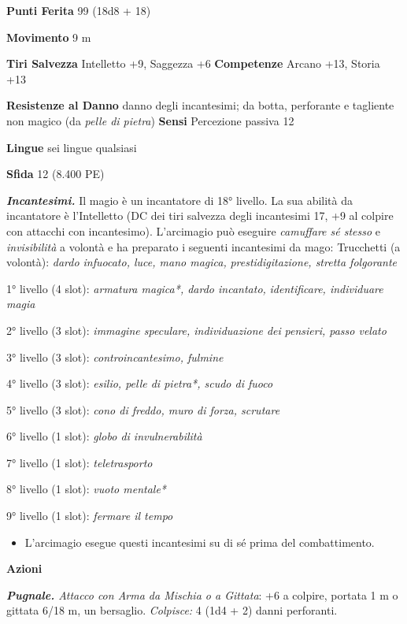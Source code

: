 \begin{multicols}{2}
\textbf{Punti Ferita} 99 (18d8 + 18)

\textbf{Movimento} 9 m

\textbf{Tiri Salvezza} Intelletto +9, Saggezza +6 \textbf{Competenze}
Arcano +13, Storia +13

\textbf{Resistenze al Danno} danno degli incantesimi; da botta,
perforante e tagliente non magico (da \emph{pelle di pietra})
\textbf{Sensi} Percezione passiva 12

\textbf{Lingue} sei lingue qualsiasi

\textbf{Sfida} 12 (8.400 PE)\smallskip

\emph{\textbf{Incantesimi.}} Il magio è un incantatore di 18° livello.
La sua abilità da incantatore è l'Intelletto (DC dei tiri salvezza
degli incantesimi 17, +9 al colpire con attacchi con incantesimo).
L'arcimagio può eseguire \emph{camuffare sé stesso} e
\emph{invisibilità} a volontà e ha preparato i seguenti incantesimi da
mago: Trucchetti (a volontà): \emph{dardo infuocato, luce, mano magica,}
\emph{prestidigitazione, stretta folgorante}

1° livello (4 slot): \emph{armatura magica*, dardo incantato,}
\emph{identificare, individuare magia}

2° livello (3 slot): \emph{immagine speculare, individuazione dei}
\emph{pensieri, passo velato}

3° livello (3 slot): \emph{controincantesimo, fulmine}

4° livello (3 slot): \emph{esilio, pelle di pietra*, scudo di fuoco}

5° livello (3 slot): \emph{cono di freddo, muro di forza, scrutare}

6° livello (1 slot): \emph{globo di invulnerabilità}

7° livello (1 slot): \emph{teletrasporto}

8° livello (1 slot): \emph{vuoto mentale*}

9° livello (1 slot): \emph{fermare il tempo}


\begin{itemize}
\item
  L'arcimagio esegue questi incantesimi su di sé prima del
  combattimento.
\end{itemize}


\smallskip\textbf{Azioni}

\emph{\textbf{Pugnale.} Attacco con Arma da Mischia o a Gittata}: +6 a
colpire, portata 1 m o gittata 6/18 m, un bersaglio. \emph{Colpisce:}
4 (1d4 + 2) danni perforanti.



\end{multicols}
